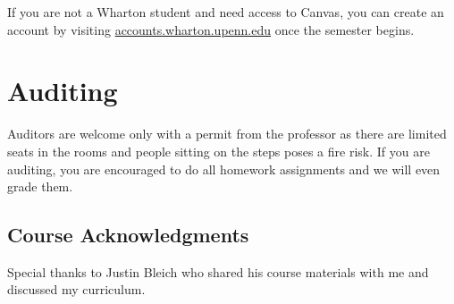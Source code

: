 \documentclass[12pt]{article}
\begin{document}
 If you are not a Wharton student and need access to Canvas, you can create an account by visiting \url{accounts.wharton.upenn.edu} once the semester begins.


\section*{Auditing}

Auditors are welcome only with a permit from the professor as there are limited seats in the rooms and people sitting on the steps poses a fire risk. If you are auditing, you are encouraged to do all homework assignments and we will even grade them. 


\subsection*{Course Acknowledgments}

Special thanks to Justin Bleich who shared his course materials with me and discussed my curriculum.

\nocite{*}

%


\end{document}
